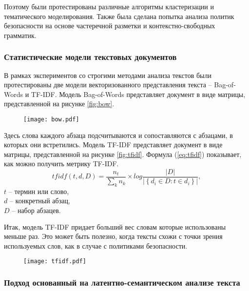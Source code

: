\documentclass[../main]{subfiles}
\begin{document}
Поэтому были протестированы различные алгоритмы кластеризации и тематического моделирования. Также была сделана попытка анализа политик безопасности на основе частеречной разметки и контекстно-свободных грамматик.

\subsubsection{Статистические модели текстовых документов}

В рамках экспериментов со строгими методами анализа текстов были протестированы две модели векторизованного представления текста -- Bag-of-Words и TF-IDF. Модель Bag-of-Words представляет документ в виде матрицы, представленной на рисунке \ref{fig:bow}. 

\begin{figure}[H]
    \centering
    {\texttt{[image: bow.pdf]}}
    \vspace{-\baselineskip}
\end{figure}

Здесь слова каждого абзаца подсчитываются и сопоставляются с абзацами, в которых они встретились. Модель TF-IDF представляет документ в виде матрицы, представленной на рисунке \ref{fig:tfidf}. Формула (\ref{eq:tfidf}) показывает, как можно получить метрику TF-IDF.
\begin{equation}
    \label{eq:tfidf}
    tfidf(t, d, D) = \frac{n_t}{\displaystyle\sum_k n_k} \times 
    log \frac{ \big|{D}\big| }
    { \big|\left\{ d_i \in D : t \in d_i \right\}\big| },
\end{equation}
$t$ -- термин или слово,\\
\makebox[1.25cm]{}$d$ -- конкретный абзац,\\
\makebox[1.25cm]{}$D$ -- набор абзацев. 

Итак, модель TF-IDF придает больший вес словам которые использованы меньше раз. Это может быть полезно, когда тексты схожи с точки зрения используемых слов, как в случае с политиками безопасности.

\begin{figure}[H]
    \centering
    {\texttt{[image: tfidf.pdf]}}
    \vspace{-\baselineskip}
\end{figure}

\subsubsection{Подход основанный на латентно-семантическом анализе текста}
\end{document}
